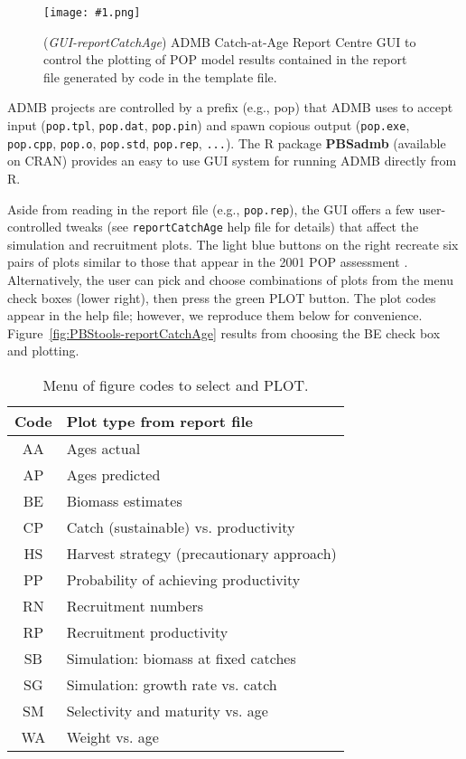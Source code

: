 \documentclass[letterpaper,12pt,fleqn]{article}
\def\tab{\hspace{0.5 in}}
\newcommand\tstrut{\rule{0pt}{2.4ex}}         %
\newcommand\bstrut{\rule[-1.0ex]{0pt}{0pt}}   %
\newcommand{\code}[1]{\small\texttt{#1}\normalsize}
\newcommand{\pkg}[1]{{\bf #1}}
\newcommand{\gui}[1]{\small\textmd{\textsf{#1}}\normalsize}
\newcommand\pbsfig[4]{    %
	\begin{figure}[ht!] %
	\centering
	\texttt{[image: \#1.png]}
	\ifthenelse{\isempty{#4}}
		{\caption[#2]{(\emph{#1}) #2}\vspace{-2ex}}
		{\caption[#4]{(\emph{#1}) #2}\vspace{-2ex}}
	\label{fig:#1}
	\end{figure}
}
\begin{document}
\pbsfig{GUI-reportCatchAge}{ADMB Catch-at-Age Report Centre GUI to control the plotting of POP model results contained in the report file generated by code in the template file.}{4.0}{ADMB Catch-at-Age Report Centre GUI}

\tab ADMB projects are controlled by a prefix (e.g., \gui{pop}) that ADMB uses to accept input (\code{pop.tpl}, \code{pop.dat}, \code{pop.pin}) and spawn copious output (\code{pop.exe}, \code{pop.cpp}, \code{pop.o}, \code{pop.std}, \code{pop.rep}, \code{...}). The R package \pkg{PBSadmb} (available on CRAN) provides an easy to use GUI system for running ADMB directly from R.

\tab Aside from reading in the report file (e.g., \code{pop.rep}), the GUI offers a few user-controlled tweaks (see \code{reportCatchAge} help file for details) that affect the simulation and recruitment plots. The light blue buttons on the right recreate six pairs of plots similar to those that appear in the 2001 POP assessment \citep{Schnute-etal:2001}. Alternatively, the user can pick and choose combinations of plots from the menu check boxes (lower right), then press the green \gui{PLOT} button. The plot codes appear in the help file; however, we reproduce them below for convenience. Figure~\ref{fig:PBStools-reportCatchAge} results from choosing the \gui{BE} check box and plotting.

\setcounter{table}{0}
\begin{table}[ht!]
  \vspace{6pt}\caption[Menu of figure codes to select and PLOT]{\gui{Menu} of figure codes to select and \gui{PLOT}.}\vspace{-6pt}
  \begin{center}
    \begin{tabular}{cl}
    \hline
    Code & Plot type from report file  \tstrut \bstrut \\
    \hline
    \gui{AA}  &  Ages actual  \tstrut \\
    \gui{AP}  &  Ages predicted \\
    \gui{BE}  &  Biomass estimates \\
    \gui{CP}  &  Catch (sustainable) vs. productivity \\
    \gui{HS}  &  Harvest strategy (precautionary approach) \\
    \gui{PP}  &  Probability of achieving productivity \\
    \gui{RN}  &  Recruitment numbers \\
    \gui{RP}  &  Recruitment productivity \\
    \gui{SB}  &  Simulation: biomass at fixed catches \\
    \gui{SG}  &  Simulation: growth rate vs. catch \\
    \gui{SM}  &  Selectivity and maturity vs. age \\
    \gui{WA}  &  Weight vs. age  \bstrut \\
    \hline
    \end{tabular}
  \end{center}
  \label{tab:GUI-reportCatchAge}
\end{table}
\end{document}
